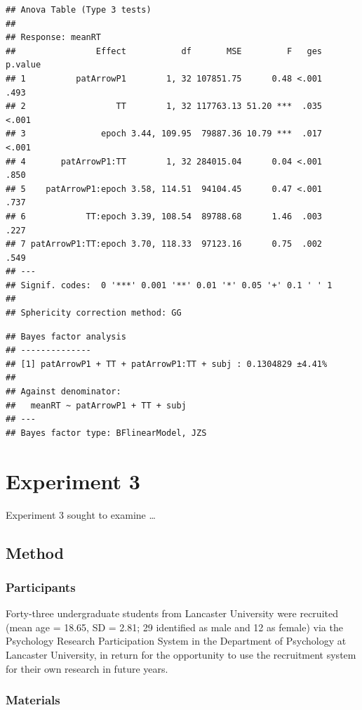 \documentclass[
  man]{apa6}
\begin{document}
\begin{verbatim}
## Anova Table (Type 3 tests)
## 
## Response: meanRT
##                Effect           df       MSE         F   ges p.value
## 1          patArrowP1        1, 32 107851.75      0.48 <.001    .493
## 2                  TT        1, 32 117763.13 51.20 ***  .035   <.001
## 3               epoch 3.44, 109.95  79887.36 10.79 ***  .017   <.001
## 4       patArrowP1:TT        1, 32 284015.04      0.04 <.001    .850
## 5    patArrowP1:epoch 3.58, 114.51  94104.45      0.47 <.001    .737
## 6            TT:epoch 3.39, 108.54  89788.68      1.46  .003    .227
## 7 patArrowP1:TT:epoch 3.70, 118.33  97123.16      0.75  .002    .549
## ---
## Signif. codes:  0 '***' 0.001 '**' 0.01 '*' 0.05 '+' 0.1 ' ' 1
## 
## Sphericity correction method: GG
\end{verbatim}

\begin{verbatim}
## Bayes factor analysis
## --------------
## [1] patArrowP1 + TT + patArrowP1:TT + subj : 0.1304829 ±4.41%
## 
## Against denominator:
##   meanRT ~ patArrowP1 + TT + subj 
## ---
## Bayes factor type: BFlinearModel, JZS
\end{verbatim}

\hypertarget{experiment-3}{%
\section{Experiment 3}\label{experiment-3}}

Experiment 3 sought to examine \ldots{}

\hypertarget{method-2}{%
\subsection{Method}\label{method-2}}

\hypertarget{participants-2}{%
\subsubsection{Participants}\label{participants-2}}

Forty-three undergraduate students from Lancaster University were recruited (mean age = 18.65, SD = 2.81; 29 identified as male and 12 as female) via the Psychology Research Participation System in the Department of Psychology at Lancaster University, in return for the opportunity to use the recruitment system for their own research in future years.

\hypertarget{materials-2}{%
\subsubsection{Materials}\label{materials-2}}
\end{document}
